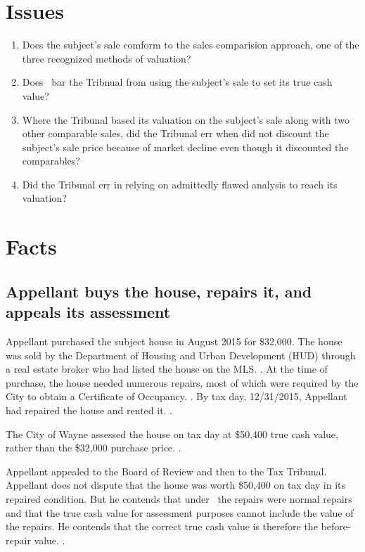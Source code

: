 \documentclass[12pt,\documentclassflag]{michiganCourtOfAppealsBrief}
\begin{document}
\section{Issues}

\begin{enumerate}
\item Does the subject's sale comform to the sales comparision approach, one of the three recognized methods of valuation?
  
\item Does \cite[s]{MCL 211.27(6)}\ bar the Tribnual from using the subject's sale to set its true cash value?
  
\item Where the Tribunal based its valuation on the subject's sale along with two other comparable sales, did the Tribunal err when did not discount the subject's sale price because of market decline even though it discounted the comparables?

\item Did the Tribunal err in relying on admittedly flawed analysis to reach its valuation?
\end{enumerate}  

\section{Facts}
\label{facts}
\subsection{Appellant buys the house, repairs it, and appeals its assessment}

Appellant purchased the subject house in August 2015 for \$32,000. The house was sold by the Department of Housing and Urban Development (HUD) through a real estate broker who had listed the house on the MLS. \mlsListing[]. At the time of purchase, the house needed numerous repairs, most of which were required by the City to obtain a Certificate of Occupancy. \repairs[]. By tax day, 12/31/2015, Appellant had repaired the house and rented it. \foj[4-5].

The City of Wayne assessed the house on tax day at \$50,400 true cash value, rather than the \$32,000 purchase price. \boardOfReviewDecision.

Appellant appealed to the Board of Review and then to the Tax Tribunal. Appellant does not dispute that the house was worth \$50,400 on tax day in its repaired condition. But he contends that under \mathieuGast\ the repairs were normal repairs and that the true cash value for assessment purposes cannot include the value of the repairs. He contends that the correct true cash value is therefore the before-repair value. \explanatoryLetter[2].
\end{document}
